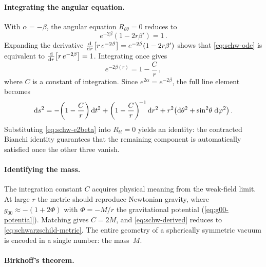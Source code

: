 \paragraph{Integrating the angular equation.}

With $\alpha = -\beta$, the angular equation $R_{\theta\theta} = 0$
reduces to
%
\begin{equation}
  e^{-2\beta}\!\left(1 - 2r\beta'\right) = 1 \,.
  \label{eq:schw-ode}
\end{equation}
%
Expanding the derivative $\frac{\mathrm{d}}{\mathrm{d} r}\bigl[r\,e^{-2\beta}\bigr]
= e^{-2\beta}(1 - 2r\beta')$ shows that \cref{eq:schw-ode} is
equivalent to $\frac{\mathrm{d}}{\mathrm{d} r}\bigl[r\,e^{-2\beta}\bigr] = 1$.
Integrating once gives
%
\begin{equation}
  e^{-2\beta(r)} = 1 - \frac{C}{r} \,,
  \label{eq:schw-e2beta}
\end{equation}
%
where $C$ is a constant of integration.  Since $e^{2\alpha} =
e^{-2\beta}$, the full line element becomes
%
\begin{equation}
  \mathrm{d} s^2 = -\!\left(1 - \frac{C}{r}\right)\mathrm{d} t^2
           + \left(1 - \frac{C}{r}\right)^{\!-1}\mathrm{d} r^2
           + r^2\!\left(\mathrm{d}\theta^2
             + \sin^2\!\theta\;\mathrm{d}\varphi^2\right) .
  \label{eq:schw-derived}
\end{equation}
%
Substituting \cref{eq:schw-e2beta} into $R_{tt} = 0$ yields an
identity: the contracted Bianchi identity guarantees that the
remaining component is automatically satisfied once the other three
vanish.

\paragraph{Identifying the mass.}

The integration constant $C$ acquires physical meaning from the
weak-field limit.  At large $r$ the metric should reproduce Newtonian
gravity, where $g_{00} \approx -(1 + 2\Phi)$ with $\Phi = -M/r$ the
gravitational potential (\cref{eq:g00-potential}).  Matching gives
$C = 2M$, and \cref{eq:schw-derived} reduces to
\cref{eq:schwarzschild-metric}.  The entire geometry
of a spherically symmetric vacuum is encoded in a single number: the
mass~$M$.

\paragraph{Birkhoff's theorem.}


